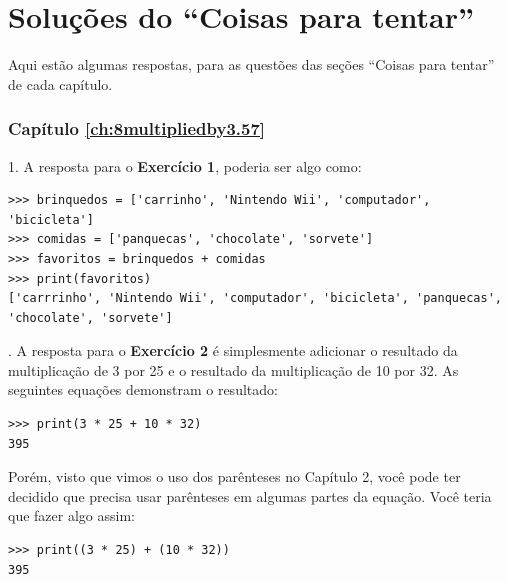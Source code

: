 

\chapter{Soluções do ``Coisas para tentar''}\label{app:answers}

Aqui estão algumas respostas, para as questões das seções ``Coisas para tentar'' de cada capítulo.

\subsection*{Capítulo \ref{ch:8multipliedby3.57}}

1. A resposta para o \textbf{Exercício 1}, poderia ser algo como:

\begin{listing}
\begin{verbatim}
>>> brinquedos = ['carrinho', 'Nintendo Wii', 'computador', 'bicicleta']
>>> comidas = ['panquecas', 'chocolate', 'sorvete']
>>> favoritos = brinquedos + comidas
>>> print(favoritos)
['carrrinho', 'Nintendo Wii', 'computador', 'bicicleta', 'panquecas', 'chocolate', 'sorvete']
\end{verbatim}
\end{listing}

. A resposta para o \textbf{Exercício 2} é simplesmente adicionar o resultado da multiplicação de 3 por 25 e o resultado da multiplicação de 10 por 32. As seguintes equações demonstram o resultado:

\begin{listing}
\begin{verbatim}
>>> print(3 * 25 + 10 * 32)
395
\end{verbatim}
\end{listing}

\noindent
Porém, visto que vimos o uso dos parênteses no Capítulo 2, você pode ter decidido que precisa usar parênteses em algumas partes da equação. Você teria que fazer algo assim:

\begin{listing}
\begin{verbatim}
>>> print((3 * 25) + (10 * 32))
395
\end{verbatim}
\end{listing}

